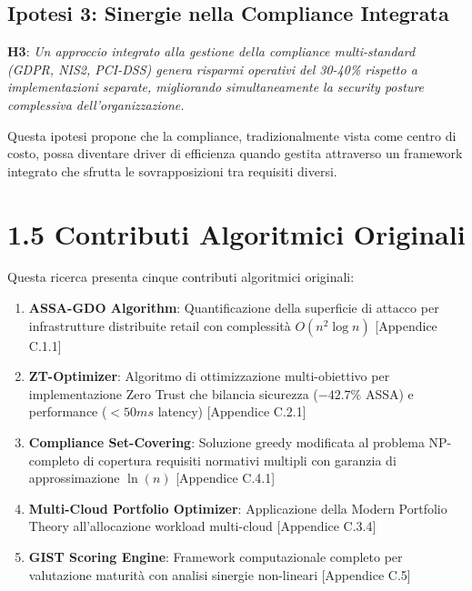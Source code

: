 \subsection{Ipotesi 3: Sinergie nella Compliance Integrata}

\textbf{H3}: \textit{Un approccio integrato alla gestione della compliance multi-standard (GDPR, NIS2, PCI-DSS) genera risparmi operativi del 30-40\% rispetto a implementazioni separate, migliorando simultaneamente la security posture complessiva dell'organizzazione.}

Questa ipotesi propone che la compliance, tradizionalmente vista come centro di costo, possa diventare driver di efficienza quando gestita attraverso un framework integrato che sfrutta le sovrapposizioni tra requisiti diversi.

\section{1.5 Contributi Algoritmici Originali}

Questa ricerca presenta cinque contributi algoritmici originali:

\begin{enumerate}
\item \textbf{ASSA-GDO Algorithm}: Quantificazione della superficie di attacco 
per infrastrutture distribuite retail con complessità $O(n^2\log n)$ 
[Appendice C.1.1]

\item \textbf{ZT-Optimizer}: Algoritmo di ottimizzazione multi-obiettivo per 
implementazione Zero Trust che bilancia sicurezza ($-42.7\%$ ASSA) e 
performance ($<50ms$ latency) [Appendice C.2.1]

\item \textbf{Compliance Set-Covering}: Soluzione greedy modificata al problema 
NP-completo di copertura requisiti normativi multipli con garanzia di 
approssimazione $\ln(n)$ [Appendice C.4.1]

\item \textbf{Multi-Cloud Portfolio Optimizer}: Applicazione della Modern 
Portfolio Theory all'allocazione workload multi-cloud [Appendice C.3.4]

\item \textbf{GIST Scoring Engine}: Framework computazionale completo per 
valutazione maturità con analisi sinergie non-lineari [Appendice C.5]
\end{enumerate}
